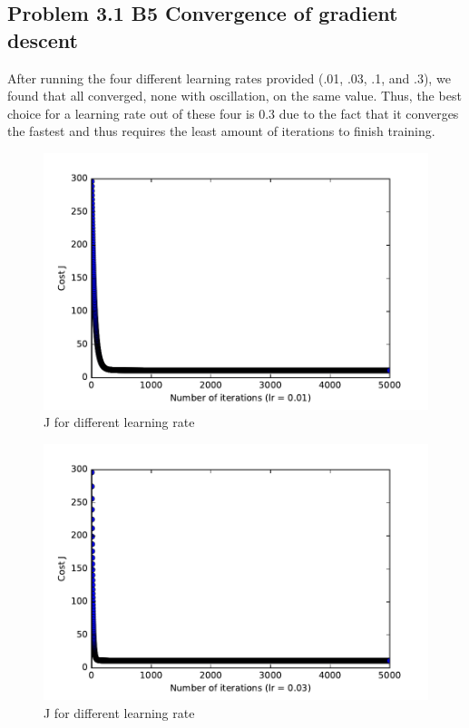 \documentclass[pdftex,11pt]{article}
\begin{document}
\subsection{Problem 3.1 B5 Convergence of gradient descent}
After running the four different learning rates provided (.01, .03, .1, and .3), we found that all converged, none with oscillation, on the same value. Thus, the best choice for a learning rate out of these four is 0.3 due to the fact that it converges the fastest and thus requires the least amount of iterations to finish training. 
\begin{figure}[H]
  \caption{J for different learning rate}
  \centering
    \includegraphics[scale=1]{fig001.pdf}
\end{figure}
\begin{figure}[H]
  \caption{J for different learning rate}
  \centering
    \includegraphics[scale=1]{fig003.pdf}
\end{figure}
\end{document}
